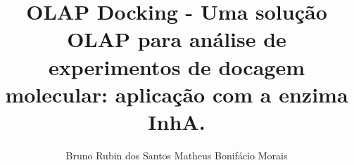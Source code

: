 \documentclass[portuguese,twoside]{pucrs-ppgcc}
\author{Bruno Rubin dos Santos Matheus Bonifácio Morais}
\title{OLAP Docking - Uma solução OLAP para análise de experimentos de docagem molecular: aplicação com a enzima I\MakeLowercase{nh}A.}
      {OLAP Docking - An OLAP solution to analyze molecular docking experiments: applied to I\MakeLowercase{nh}A enzyme.}
\begin{document}
\let\cleardoublepage\clearpage




%
%
%
\end{document}

